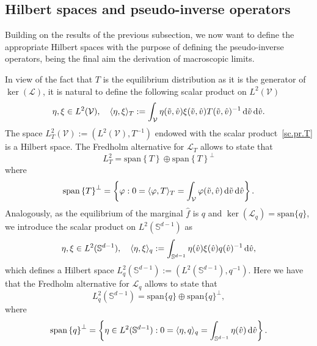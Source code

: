 \documentclass[a4paper]{article}
\theoremstyle{Theorem}\newtheorem{proposition}{Proposition}[section]
\theoremstyle{Remark}\newtheorem{remark}{Remark}[section]
\theoremstyle{Theorem}\newtheorem{theorem}{Theorem}[section]
\DeclarePairedDelimiter\ave{\langle}{\rangle}
\newcommand{\hv}{\hat{v}}
\newcommand{\tv}{\tilde{v}}
\newcommand{\hf}{\hat{f}}
\newcommand{\intS}{\int_{\mathbb{S}^{d-1}}}
\newcommand{\intV}{\int_{\mathcal{V}}}
\begin{document}

\subsection{Hilbert spaces and pseudo-inverse operators}
Building on the results of the previous subsection, we now want to define the appropriate Hilbert spaces
with the purpose of defining the pseudo-inverse operators, being the final aim the derivation of macroscopic limits. 

In view of the fact that $T$ is the equilibrium distribution as it is the generator of $\ker(\mathcal{L})$, it is natural to define the following scalar product on $L^2(\mathcal{V})$
\begin{equation}\label{sc.pr.T}
    \eta, \xi \in L^2(\mathcal{V}), \quad \ave{\eta,\xi}_T:=\intV \eta(\tv,\hv) \xi(\tv,\hv) T(\tv,\hv)^{-1} \, {\rm d} \tv \, {\rm d} \hv.
\end{equation}
The space $L^2_T(\mathcal{V}):=(L^2(\mathcal{V}),T^{-1})$ endowed with the scalar product~\eqref{sc.pr.T} is a Hilbert space. The Fredholm alternative for $\mathcal{L}_T$ allows to state that
\[
L^2_T= \text{span}\left\lbrace T\right\rbrace \oplus \text{span}\left\lbrace T\right\rbrace^{\bot}
\]
where
\begin{equation*}
 \text{span}\left\lbrace T\right\rbrace^{\bot}=\left\lbrace \varphi: 0=\ave{\varphi,T}_T=\intV \varphi(\tv,\hv) \, {\rm d} \tv \, {\rm d} \hv \right\rbrace.   
\end{equation*}
Analogously, as the equilibrium of the marginal $\hf$ is $q$ and $\ker(\mathcal{L}_q)=\text{span}\lbrace q \rbrace$, we introduce the scalar product on $L^2(\mathbb{S}^{d-1})$ as
\begin{equation*}\label{sc.pr.q}
    \eta, \xi \in L^2(\mathbb{S}^{d-1}), \quad \ave{\eta,\xi}_q:=\intS \eta(\hv) \xi(\hv) q(\hv)^{-1}  \, {\rm d} \hv,
\end{equation*}
which defines a Hilbert space $L^2_q(\mathbb{S}^{d-1}):=(L^2(\mathbb{S}^{d-1}),q^{-1})$. 
Here we have that the Fredholm alternative for $\mathcal{L}_q$ allows to state that
\[
L^2_q(\mathbb{S}^{d-1}) = \text{span}\lbrace q \rbrace \oplus \text{span}\lbrace q \rbrace^\bot, 
\]
where
\begin{equation*}
 \text{span}\left\lbrace q\right\rbrace^{\bot}=\left\lbrace \eta\in L^2(\mathbb{S}^{d-1}) : 0=\ave{\eta,q}_q=\intS \eta(\hv) \, {\rm d} \hv \right\rbrace.   
\end{equation*}
\end{document}
